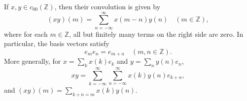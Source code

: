If $x, y \in c_{00}(\mathbb{Z})$, then their convolution is given by
$$(xy)(m) = \sum_{n=-\infty}^{\infty} x(m-n) y(n) \quad (m \in \mathbb{Z}),$$
where for each $m \in \mathbb{Z}$, all but finitely many terms on the right side are zero. In particular, the basis vectors satisfy
$$e_m e_n = e_{m+n} \quad (m, n \in \mathbb{Z}).$$
More generally, for $x = \sum_k x(k) e_k$ and $y = \sum_n y(n) e_n$,
$$xy = \sum_{k=-\infty}^{\infty} \sum_{n=-\infty}^{\infty} x(k) y(n) e_{k+n},$$
and $(xy)(m) = \sum_{k+n=m} x(k) y(n)$.
